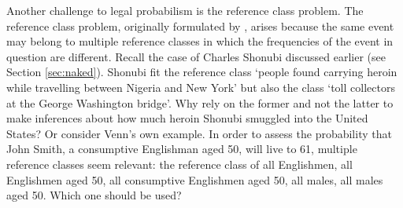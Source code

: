 \documentclass{article}
\begin{document}
\label{sec:reference}


Another challenge to legal probabilism is the reference 
class problem. 
The reference class problem, originally formulated by  \cite{venn1866logic}, arises because the same event may belong to multiple reference  classes in which the frequencies of the event in question are different. %
Recall the case of Charles Shonubi discussed earlier (see Section \ref{sec:naked}). 
%
Shonubi fit the reference class `people found carrying heroin while travelling between Nigeria and New York' but also the class `toll collectors at the George Washington bridge'. Why rely on the former and not the latter to make inferences about how much heroin Shonubi smuggled into the United States? %
Or consider Venn's own example. In order to assess the probability that John Smith, a consumptive Englishman aged 50, will live to 61, multiple reference classes seem relevant: the reference class of all Englishmen, all Englishmen aged 50, all consumptive Englishmen aged 50, all males, all males aged 50. Which one should be used? 
%
\end{document}

